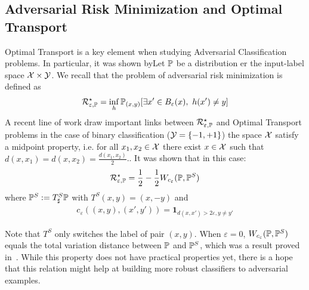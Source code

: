 
\subsection{Adversarial Risk Minimization and Optimal Transport} Optimal Transport is a key element when studying Adversarial Classification problems. In particular, it was shown byLet $\mathbb{P}$ be a distribution er the input-label space $\mathcal{X}\times\mathcal{Y}$. We recall that the problem of adversarial risk minimization is defined as
\begin{align*}
    \risk_{\varepsilon,\PP}^\star = \inf_{h} \PP_{(x,y)}\left[\exists x'\in B_\varepsilon(x),~h(x')\neq y\right]
\end{align*}
A recent line of work draw important links between   $\mathcal{R}_{\varepsilon,\mathbb{P}}^\star$ and Optimal Transport problems in the case of binary classification ($\mathcal{Y}=\{-1,+1\}$) the space $\mathcal{X}$ satisfy a midpoint property, i.e. for all $x_1,x_2\in\mathcal{X}$ there exist $x\in\mathcal{X}$ such that $d(x,x_1) = d(x,x_2) =\frac{d(x_1,x_2)}{2}$.. It was shown that in this case:
\begin{align*}
\mathcal{R}_{\varepsilon,\mathbb{P}}^\star = \frac12-\frac12 W_{c_\varepsilon}(\mathbb{P},\mathbb{P}^S)
\end{align*}
where $\mathbb{P}^S := T^S_\sharp \mathbb{P}$ with $T^S(x,y) = (x,-y)$ and
\begin{align*}
    c_\varepsilon\left((x,y),(x',y')\right) = \mathbf{1}_{d(x,x')>2\varepsilon,y\neq y'}
\end{align*}

Note that $T^S$ only switches the label of pair $(x,y)$. When $\varepsilon=0$, $W_{c_\varepsilon}(\mathbb{P},\mathbb{P}^S)$ equals the total variation distance between $\mathbb{P}$ and $\mathbb{P}^S$, which was a result proved in~\citep{xxx}.
While this property does not have practical properties yet, there is a hope that this relation might help at building more robust classifiers to adversarial examples. 

